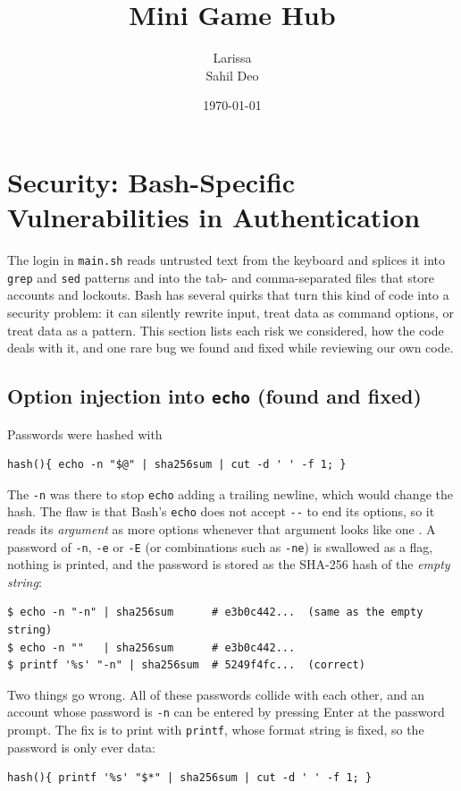 \documentclass[12pt]{article}
\title{\textbf{Mini Game Hub}}
\author{Larissa \\ Sahil Deo}
\date{\today}
\begin{document}
\maketitle
\tableofcontents
\clearpage
\section{Security: Bash-Specific Vulnerabilities in Authentication}

The login in \texttt{main.sh} reads untrusted text from the keyboard and splices it into \texttt{grep} and \texttt{sed} patterns and into the tab- and comma-separated files that store accounts and lockouts. Bash has several quirks that turn this kind of code into a security problem: it can silently rewrite input, treat data as command options, or treat data as a pattern. This section lists each risk we considered, how the code deals with it, and one rare bug we found and fixed while reviewing our own code.

\subsection{Option injection into \texttt{echo} (found and fixed)}
Passwords were hashed with
\begin{lstlisting}
hash(){ echo -n "$@" | sha256sum | cut -d ' ' -f 1; }
\end{lstlisting}
The \texttt{-n} was there to stop \texttt{echo} adding a trailing newline, which would change the hash. The flaw is that Bash's \texttt{echo} does not accept \texttt{-{}-} to end its options, so it reads its \emph{argument} as more options whenever that argument looks like one \cite{bash_builtins}. A password of \texttt{-n}, \texttt{-e} or \texttt{-E} (or combinations such as \texttt{-ne}) is swallowed as a flag, nothing is printed, and the password is stored as the SHA-256 hash of the \emph{empty string}:
\begin{lstlisting}
$ echo -n "-n" | sha256sum      # e3b0c442...  (same as the empty string)
$ echo -n ""   | sha256sum      # e3b0c442...
$ printf '%s' "-n" | sha256sum  # 5249f4fc...  (correct)
\end{lstlisting}
Two things go wrong. All of these passwords collide with each other, and an account whose password is \texttt{-n} can be entered by pressing Enter at the password prompt. The fix is to print with \texttt{printf}, whose format string is fixed, so the password is only ever data:
\begin{lstlisting}
hash(){ printf '%s' "$*" | sha256sum | cut -d ' ' -f 1; }
\end{lstlisting}
\end{document}
